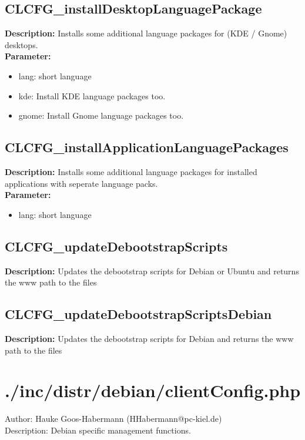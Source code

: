 \subsection{CLCFG\_installDesktopLanguagePackage}
\textbf{Description:} Installs some additional language packages for (KDE / Gnome) desktops.\\
\textbf{Parameter:}
\begin{itemize}
\item lang: short language
\item kde: Install KDE language packages too.
\item gnome: Install Gnome language packages too.
\end{itemize}

\subsection{CLCFG\_installApplicationLanguagePackages}
\textbf{Description:} Installs some additional language packages for installed applications with seperate language packs.\\
\textbf{Parameter:}
\begin{itemize}
\item lang: short language
\end{itemize}

\subsection{CLCFG\_updateDebootstrapScripts}
\textbf{Description:} Updates the debootstrap scripts for Debian or Ubuntu and returns the www path to the files\\

\subsection{CLCFG\_updateDebootstrapScriptsDebian}
\textbf{Description:} Updates the debootstrap scripts for Debian and returns the www path to the files\\

\newpage\section{./inc/distr/debian/clientConfig.php}
 Author: Hauke Goos-Habermann (HHabermann@pc-kiel.de)\\
 Description: Debian specific management functions.\\

